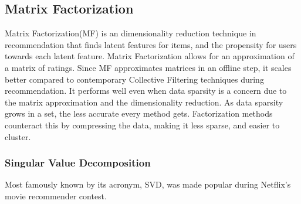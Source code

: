 \subsection{Matrix Factorization} \label{bg:matrixfactorization}
Matrix Factorization(MF) is an dimensionality reduction technique in recommendation that finds latent features for items, and the propensity for users towards each latent feature.
Matrix Factorization allows for an approximation of a matrix of ratings.
Since MF approximates matrices in an offline step, it scales better compared to contemporary Collective Filtering techniques during recommendation. It performs well even when data sparsity is a concern due to the matrix approximation and the dimensionality reduction.
As data sparsity grows in a set, the less accurate every method gets. Factorization methods counteract this by compressing the data, making it less sparse, and easier to cluster.
\subsubsection{Singular Value Decomposition}
Most famously known by its acronym, SVD, was made popular during Netflix's movie recommender contest.
